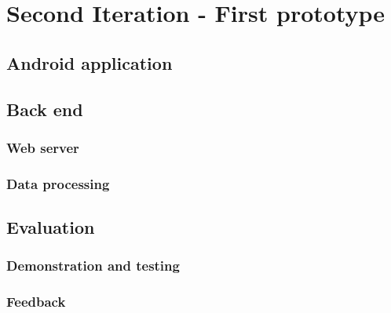 \documentclass[../Main/thesis.tex]{subfiles}
\begin{document}
\chapter{Second Iteration  - First prototype}
\label{ch:development-1}

\section{Android application}

\section{Back end}
\subsection{Web server}
\subsection{Data processing}

\section{Evaluation}
\subsection{Demonstration and testing}
\subsection{Feedback}
\end{document}
